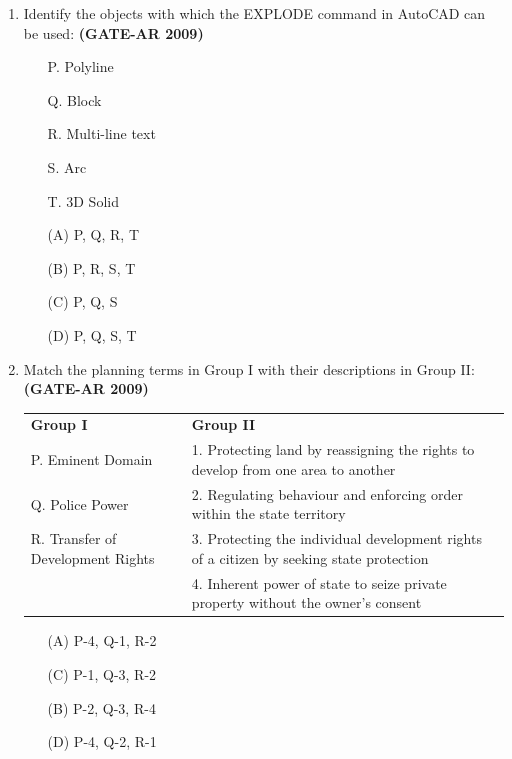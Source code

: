 \documentclass[a4paper,10pt]{article}
\begin{document}
\begin{enumerate}
    \item Identify the objects with which the EXPLODE command in AutoCAD can be used: \hfill \textbf{(GATE-AR 2009)}
    \begin{itemize}
		\item[P.] Polyline
		\item[Q.] Block
		\item[R.] Multi-line text
		\item[S.] Arc
		\item[T.] 3D Solid
	\end{itemize}
	\begin{multicols}{4}
	\begin{itemize}
        \item[(A)] P, Q, R, T
        \item[(B)] P, R, S, T
        \item[(C)] P, Q, S
        \item[(D)] P, Q, S, T
    \end{itemize}
	\end{multicols}

    \item Match the planning terms in Group I with their descriptions in Group II: \hfill \textbf{(GATE-AR 2009)} \\
    \begin{tabular}{ p{\dimexpr\columnwidth-2\tabcolsep} p{\dimexpr\columnwidth-2\tabcolsep} }
	\textbf{Group I} & \textbf{Group II} \\
	P. Eminent Domain & 1. Protecting land by reassigning the rights to develop from one area to another \\
	Q. Police Power & 2. Regulating behaviour and enforcing order within the state territory \\
	R. Transfer of Development Rights & 3. Protecting the individual development rights of a citizen by seeking state protection \\
	& 4. Inherent power of state to seize private property without the owner’s consent \\
	\end{tabular}
	\begin{multicols}{2}
	\begin{itemize}
        \item[(A)] P-4, Q-1, R-2
        \item[(C)] P-1, Q-3, R-2
        \item[(B)] P-2, Q-3, R-4
        \item[(D)] P-4, Q-2, R-1
    \end{itemize}
	\end{multicols}


\end{enumerate}
\end{document}
